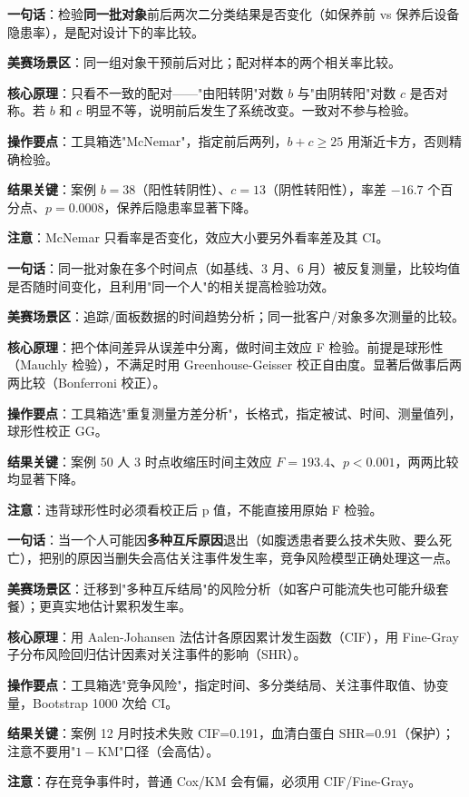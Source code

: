 \begin{algobrief}
\textbf{一句话}：检验\textbf{同一批对象}前后两次二分类结果是否变化（如保养前 vs 保养后设备隐患率），是配对设计下的率比较。

\textbf{美赛场景区}：同一组对象干预前后对比；配对样本的两个相关率比较。

\textbf{核心原理}：只看不一致的配对——"由阳转阴"对数 $b$ 与"由阴转阳"对数 $c$ 是否对称。若 $b$ 和 $c$ 明显不等，说明前后发生了系统改变。一致对不参与检验。

\textbf{操作要点}：工具箱选"McNemar"，指定前后两列，$b+c \geq 25$ 用渐近卡方，否则精确检验。

\textbf{结果关键}：案例 $b=38$（阳性转阴性）、$c=13$（阴性转阳性），率差 $-16.7$ 个百分点、$p=0.0008$，保养后隐患率显著下降。

\textbf{注意}：McNemar 只看率是否变化，效应大小要另外看率差及其 CI。
\end{algobrief}


\begin{algobrief}
\textbf{一句话}：同一批对象在多个时间点（如基线、3 月、6 月）被反复测量，比较均值是否随时间变化，且利用"同一个人"的相关提高检验功效。

\textbf{美赛场景区}：追踪/面板数据的时间趋势分析；同一批客户/对象多次测量的比较。

\textbf{核心原理}：把个体间差异从误差中分离，做时间主效应 F 检验。前提是球形性（Mauchly 检验），不满足时用 Greenhouse-Geisser 校正自由度。显著后做事后两两比较（Bonferroni 校正）。

\textbf{操作要点}：工具箱选"重复测量方差分析"，长格式，指定被试、时间、测量值列，球形性校正 GG。

\textbf{结果关键}：案例 50 人 3 时点收缩压时间主效应 $F=193.4$、$p<0.001$，两两比较均显著下降。

\textbf{注意}：违背球形性时必须看校正后 p 值，不能直接用原始 F 检验。
\end{algobrief}


\begin{algobrief}
\textbf{一句话}：当一个人可能因\textbf{多种互斥原因}退出（如腹透患者要么技术失败、要么死亡），把别的原因当删失会高估关注事件发生率，竞争风险模型正确处理这一点。

\textbf{美赛场景区}：迁移到"多种互斥结局"的风险分析（如客户可能流失也可能升级套餐）；更真实地估计累积发生率。

\textbf{核心原理}：用 Aalen-Johansen 法估计各原因累计发生函数（CIF），用 Fine-Gray 子分布风险回归估计因素对关注事件的影响（SHR）。

\textbf{操作要点}：工具箱选"竞争风险"，指定时间、多分类结局、关注事件取值、协变量，Bootstrap 1000 次给 CI。

\textbf{结果关键}：案例 12 月时技术失败 CIF=0.191，血清白蛋白 SHR=0.91（保护）；注意不要用"$1-$KM"口径（会高估）。

\textbf{注意}：存在竞争事件时，普通 Cox/KM 会有偏，必须用 CIF/Fine-Gray。
\end{algobrief}

